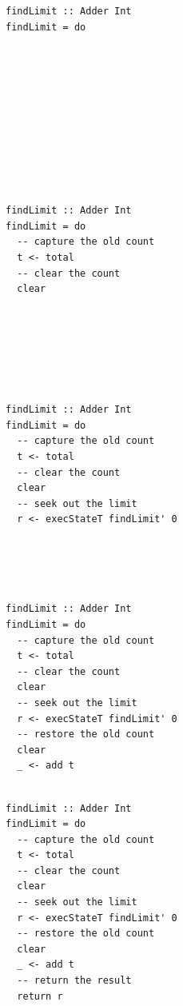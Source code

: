 \documentclass{beamer}
\begin{document}
\begin{frame}[fragile]
  \begin{overprint}
  \begin{verbatim}
findLimit :: Adder Int
findLimit = do











  \end{verbatim}
  \begin{verbatim}
findLimit :: Adder Int
findLimit = do
  -- capture the old count
  t <- total
  -- clear the count
  clear







  \end{verbatim}
  \begin{verbatim}
findLimit :: Adder Int
findLimit = do
  -- capture the old count
  t <- total
  -- clear the count
  clear
  -- seek out the limit
  r <- execStateT findLimit' 0





  \end{verbatim}
  \begin{verbatim}
findLimit :: Adder Int
findLimit = do
  -- capture the old count
  t <- total
  -- clear the count
  clear
  -- seek out the limit
  r <- execStateT findLimit' 0
  -- restore the old count
  clear
  _ <- add t


  \end{verbatim}
  \begin{verbatim}
findLimit :: Adder Int
findLimit = do
  -- capture the old count
  t <- total
  -- clear the count
  clear
  -- seek out the limit
  r <- execStateT findLimit' 0
  -- restore the old count
  clear
  _ <- add t
  -- return the result
  return r
  \end{verbatim}
  \end{overprint}
\end{frame}
\end{document}
